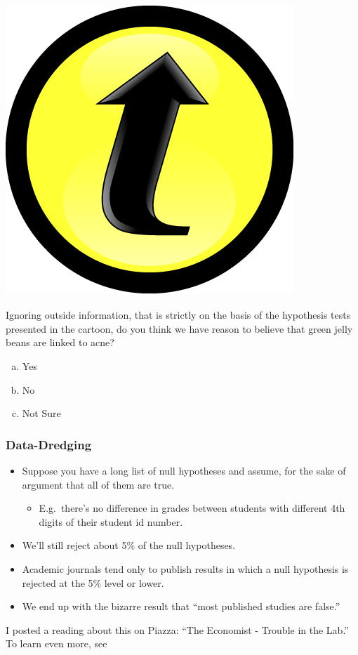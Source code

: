 \documentclass[handout]{beamer}
\begin{document}
\begin{frame}
\frametitle{\hfill \includegraphics[scale = 0.05]{./images/clicker}}
Ignoring outside information, that is strictly on the basis of the hypothesis tests presented in the cartoon, do you think we have reason to believe that green jelly beans are linked to acne?
	\begin{enumerate}[(a)]
		\item Yes
		\item No
		\item Not Sure
	\end{enumerate}

\end{frame}
\begin{frame}
\frametitle{Data-Dredging}
\begin{itemize}
	\item Suppose you have a long list of null hypotheses and assume, for the sake of argument that all of them are true.
		\begin{itemize}
			\item E.g.\ there's no difference in grades between students with different 4th digits of their student id number. 
		\end{itemize}
	\item We'll still reject about 5\% of the null hypotheses.
	\item Academic journals tend only to publish results in which a null hypothesis is rejected at the 5\% level or lower. 
	\item We end up with the bizarre result that ``most published studies are false.''  
\end{itemize}


\alert{I posted a reading about this on Piazza: ``The Economist - Trouble in the Lab.'' To learn even more, see \href{http://www.plosmedicine.org/article/info:doi/10.1371/journal.pmed.0020124}{\textcolor{blue}{}}}


\end{frame}
\end{document}
